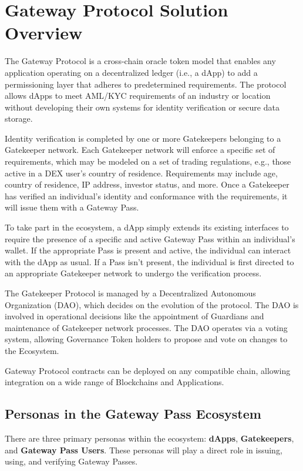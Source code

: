 \section{Gateway Protocol Solution Overview}\label{sec:solution}
The Gateway Protocol is a cross-chain oracle token model that enables any application operating on a decentralized ledger (i.e., a dApp) to add a permissioning layer that adheres to predetermined requirements. The protocol allows dApps to meet AML/KYC requirements of an industry or location without developing their own systems for identity verification or secure data storage.

Identity verification is completed by one or more Gatekeepers belonging to a Gatekeeper network. Each Gatekeeper network will enforce a specific set of requirements, which may be modeled on a set of trading regulations, e.g., those active in a DEX user’s country of residence. Requirements may include age, country of residence, IP address, investor status, and more. Once a Gatekeeper has verified an individual’s identity and conformance with the requirements, it will issue them with a Gateway Pass.

To take part in the ecosystem, a dApp simply extends its existing interfaces to require the presence of a specific and active Gateway Pass within an individual’s wallet. If the appropriate Pass is present and active, the individual can interact with the dApp as usual. If a Pass isn’t present, the individual is first directed to an appropriate Gatekeeper network to undergo the verification process.

The Gatekeeper Protocol is managed by a Decentralized Autonomous Organization (DAO), which decides on the evolution of the protocol. The DAO is involved in operational decisions like the appointment of Guardians and maintenance of Gatekeeper network processes. The DAO operates via a voting system, allowing Governance Token holders to propose and vote on changes to the Ecosystem.

Gateway Protocol contracts can be deployed on any compatible chain, allowing integration on a wide range of Blockchains and Applications.

\subsection{Personas in the Gateway Pass Ecosystem}

There are three primary personas within the ecosystem: \textbf{dApps}, \textbf{Gatekeepers}, and \textbf{Gateway Pass Users}. These personas will play a direct role in issuing, using, and verifying Gateway Passes.

